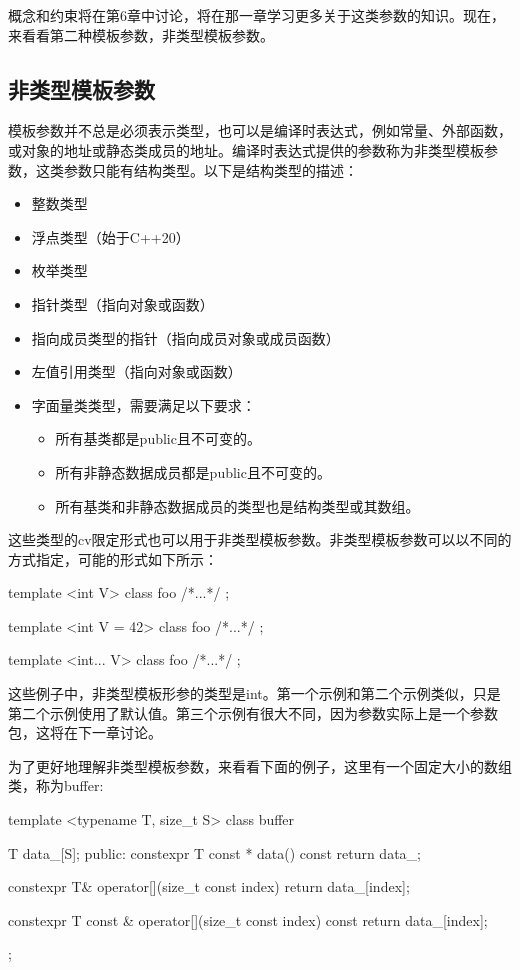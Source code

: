 概念和约束将在第6章中讨论，将在那一章学习更多关于这类参数的知识。现在，来看看第二种模板参数，非类型模板参数。


\subsection{非类型模板参数}

模板参数并不总是必须表示类型，也可以是编译时表达式，例如常量、外部函数，或对象的地址或静态类成员的地址。编译时表达式提供的参数称为非类型模板参数，这类参数只能有结构类型。以下是结构类型的描述：

\begin{itemize}
  \item 整数类型
  \item 浮点类型（始于C++20）
  \item 枚举类型
  \item 指针类型（指向对象或函数）
  \item 指向成员类型的指针（指向成员对象或成员函数）
  \item 左值引用类型（指向对象或函数）
  \item 字面量类类型，需要满足以下要求：
        \begin{itemize}
          \item 所有基类都是public且不可变的。
          \item 所有非静态数据成员都是public且不可变的。
          \item 所有基类和非静态数据成员的类型也是结构类型或其数组。
        \end{itemize}
\end{itemize}

这些类型的cv限定形式也可以用于非类型模板参数。非类型模板参数可以以不同的方式指定，可能的形式如下所示：

\begin{cpp}
template <int V>
class foo { /*...*/ };

template <int V = 42>
class foo { /*...*/ };

template <int... V>
class foo { /*...*/ };
\end{cpp}

这些例子中，非类型模板形参的类型是int。第一个示例和第二个示例类似，只是第二个示例使用了默认值。第三个示例有很大不同，因为参数实际上是一个参数包，这将在下一章讨论。

为了更好地理解非类型模板参数，来看看下面的例子，这里有一个固定大小的数组类，称为buffer:

\begin{cpp}
template <typename T, size_t S>
class buffer
{
	T data_[S];
public:
	constexpr T const * data() const { return data_; }
	
	constexpr T& operator[](size_t const index)
	{
		return data_[index];
	}

	constexpr T const & operator[](size_t const index) const
	{
		return data_[index];
	}
};
\end{cpp}

